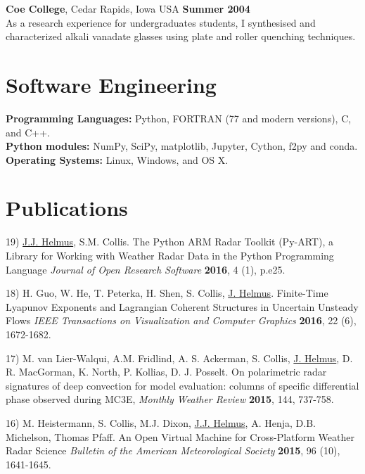 \documentclass[margin,line]{res}
\begin{document}
\begin{resume}
\vspace{-0.1in}

{\bf Coe College}, Cedar Rapids, Iowa USA \hfill {\bf Summer 2004}\\
As a research experience for undergraduates students,
I synthesised and characterized alkali vanadate glasses using plate and
roller quenching techniques.

\section{\sc Software Engineering}
{\bf Programming Languages:} Python, FORTRAN (77 and modern versions), C, and C++.\\
{\bf Python modules:} NumPy, SciPy, matplotlib, Jupyter, Cython, f2py and conda.\\
{\bf Operating Systems:}  Linux, Windows, and OS X.\\

\section{\sc Publications}
19) \underline{J.J. Helmus}, S.M. Collis.
The Python ARM Radar Toolkit (Py-ART), a Library for Working with Weather
Radar Data in the Python Programming Language
{\em Journal of Open Research Software} {\bf 2016}, 4 (1), p.e25.

18) H. Guo, W. He, T. Peterka, H. Shen, S. Collis, \underline{J. Helmus}.
Finite-Time Lyapunov Exponents and Lagrangian Coherent Structures in
Uncertain Unsteady Flows
{\em IEEE Transactions on Visualization and Computer Graphics} {\bf 2016},
22 (6), 1672-1682.

17) M. van Lier-Walqui, A.M. Fridlind, A. S. Ackerman, S. Collis,
\underline{J. Helmus}, D. R. MacGorman, K. North, P. Kollias, D. J. Posselt.
On polarimetric radar signatures of deep convection for model evaluation:
columns of specific differential phase observed during MC3E,
{\em Monthly Weather Review} {\bf 2015}, 144, 737-758.

16) M. Heistermann, S. Collis, M.J. Dixon,
\underline{J.J. Helmus}, A. Henja, D.B. Michelson, Thomas Pfaff.
An Open Virtual Machine for Cross-Platform Weather Radar Science
{\em Bulletin of the American Meteorological Society} {\bf 2015},
96 (10), 1641-1645.


\end{resume}
\end{document}
